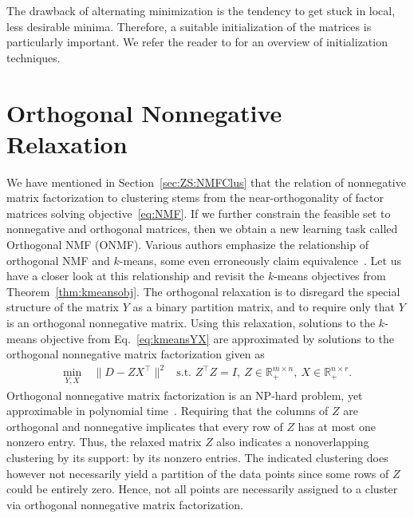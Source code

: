 The drawback of alternating minimization is the tendency to get stuck in local, less desirable minima. Therefore, a suitable initialization of the matrices is particularly important. We refer the reader to \cite{celebi2013comparative} for an overview of initialization techniques. 
\section{Orthogonal Nonnegative  Relaxation}\label{sec:ZS:OrthogonalRelaxation} 
We have mentioned in Section~\ref{sec:ZS:NMFClus} that the relation of nonnegative matrix factorization to clustering stems from the near-orthogonality of factor matrices solving objective~\eqref{eq:NMF}. If we further constrain the feasible set to nonnegative and orthogonal  matrices, then we obtain a new learning task called Orthogonal NMF (ONMF).
Various authors emphasize the relationship of orthogonal NMF and $k$-means, some even erroneously claim equivalence~\citep{ding2005equivalence, ding2006orthogonal, li2006relationships}. Let us have a closer look at this relationship and revisit the $k$-means objectives from Theorem~\ref{thm:kmeansobj}. The orthogonal relaxation is to disregard the special structure of the matrix $Y$ as a binary partition matrix, and to require only that $Y$ is an orthogonal nonnegative matrix. Using this relaxation, solutions to the $k$-means objective from Eq.~\eqref{eq:kmeansYX} are approximated by solutions to the orthogonal nonnegative matrix factorization given as
\begin{align}\label{eq:ONMF}
    \min_{Y,X} &\ \bigl\lVert D-ZX^\top\bigr\rVert ^2 &\text{s.t. } Z^\top Z=I,\  Z\in\mathbb{R}_+^{m\times n},\  X\in\mathbb{R}_+^{n\times r}.
\end{align}
Orthogonal nonnegative matrix factorization is an NP-hard problem, yet approximable in polynomial time~\citep{asteris2015orthogonal}.
Requiring that the columns of $Z$ are orthogonal and nonnegative implicates that every row of $Z$ has at most one nonzero entry. Thus, the relaxed matrix $Z$ also indicates a nonoverlapping clustering by its support: by its nonzero entries. The indicated clustering does however not necessarily yield a partition of the data points since some rows of $Z$ could be entirely zero. Hence, not all points are necessarily assigned to a cluster via orthogonal nonnegative matrix factorization.

